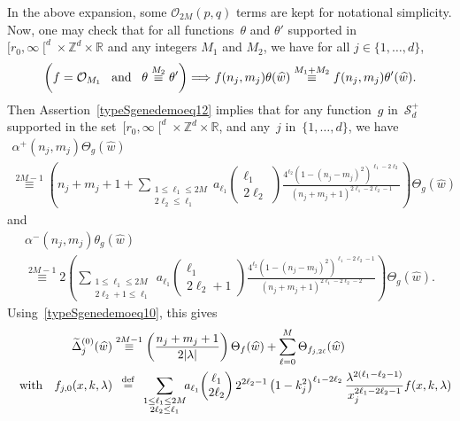 \documentclass[10pt]{amsart}
\theoremstyle{definition}\newtheorem{defi}[theo]{Definition}\newtheorem{rema}[theo]{Remark}\newtheorem{exam}[theo]{Example}\newtheorem{exem}[theo]{Example}\newtheorem{nota}[theo]{Notation}
\newcommand*\sumetage[2]{\sum_{\substack{{#1}\\{#2}}}}
\newcommand{\lam}{\lambda}
\newcommand{\D}{\Delta}
\newcommand{\wt}{\widetilde}
\newcommand{\wh}{\widehat}
\newcommand*\cO{\mathcal{O}}
\newcommand*\cS{\mathcal{S}}
\newcommand*\R{\mathbb{R}}
\newcommand*\ZZ{\mathbb{Z}}
\newcommand{\andf}{\quad\hbox{and}\quad}
\newcommand{\with}{\quad\hbox{with}\quad}
\newcommand*\eqdefa{\overset{\mathrm{def}}{=}}
\newcommand*\equivH[1]{\overset{#1}{\equiv}}
\begin{document}
In the above expansion, some $\cO_{2M}(p,q)$ terms are kept for notational simplicity. Now, one may check that for all functions~$\theta$ and $\theta'$ supported in~$[r_0,\infty\mathclose{[}^d\times \ZZ^d\times \R$ and any integers $M_1$ and $M_2$, we have for all $j\in\{1,\dots,d\}$,
\begin{equation}\label{typeSgenedemoeq10}
\left(f=\cO_{M_1} \!\andf \! \theta \equivH {M_2} \theta'\right) \Longrightarrow f(n_j,m_j) \theta(\wh w) \equivH {M_1+M_2} f(n_j,m_j) \theta'(\wh w).
\end{equation}
Then Assertion~\eqref{typeSgenedemoeq12} implies that for any function~$g $ in~$\cS_d^+$ supported in the set~$[r_0,\infty\mathclose{[}^d\times \ZZ^d\times \R$, and any~$j$ in~$\{1,\dots,d\}$, we have
\begin{multline}\label{eq:alpha+}
\alpha^+(n_j,m_j) \Theta_g(\wh w) \\
\equivH {2M-1} \left(n_j+m_j+1
+\sumetage {1\leq \ell_1\leq 2M} {2\ell_2\leq \ell_1} \! a_{\ell_1}
\begin{pmatrix} \ell_1 \\ 2\ell_2
\end{pmatrix} \frac {4^{\ell_2} (1-(n_j-m_j)^2)^{\ell_1-2\ell_2} } {(n_j+m_j+1)^{2\ell_1-2\ell_2-1}}\right) \Theta_g(\wh w)
\end{multline}
and
\begin{multline}\label{eq:alpha-}
\alpha^-(n_j,m_j) \theta_g(\wh w) \\ \equivH {2M-1} 2\left(\sumetage {1\leq \ell_1\leq 2M} {2\ell_2+1\leq \ell_1} \!a_{\ell_1}\!
\begin{pmatrix} \ell_1 \\ 2\ell_2\!+\!1
\end{pmatrix} \frac {4^{\ell_2}
\left(1-(n_j-m_j)^2\right)^{\ell_1-2\ell_2-1} } {(n_j\!+\!m_j\!+\!1)^{2\ell_1-2\ell_2-2}}\right) \Theta_g(\wh w).
\end{multline}
Using~\eqref{typeSgenedemoeq10}, this gives
\[
\begin{aligned}
\wt \D_j^{(0)} (\wh w) &\equivH{2M-1} \left(\frac {n_j+m_j+1} {2|\lam|}\right) \Theta_f(\wh w) +\sum_{\ell=0}^M \Theta_{f_{j,2\ell}}(\wh w) \\ \with
f_{j,0} (x,k,\lam) &\;\:\eqdefa\;\, \sumetage {1\leq \ell_1\leq 2M} {2\ell_2\leq \ell_1}\!\! a_{\ell_1}\!
\begin{pmatrix} \ell_1 \\ 2\ell_2
\end{pmatrix} 2^{2\ell_2-1} \left(1-k_j^2\right)^{\ell_1-2\ell_2} \frac { \lam^{2(\ell_1-\ell_2-1)}} {x_j^{2\ell_1-2\ell_2-1}} f(x,k,\lam)
\end{aligned}
\]
\end{document}
